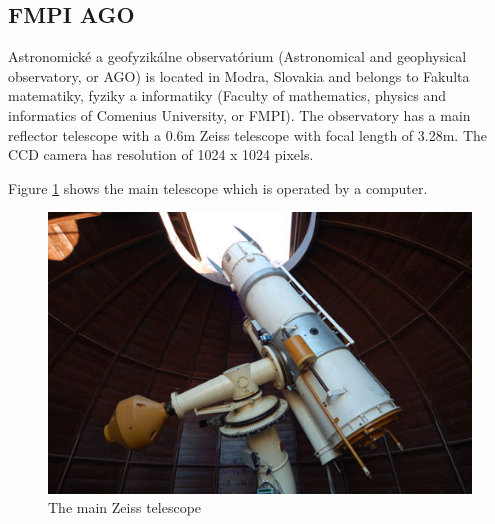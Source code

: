\subsection{FMPI AGO}\label{subsec:fmpi_ago}
Astronomické a geofyzikálne observatórium (Astronomical and geophysical observatory, or AGO) is located in Modra, Slovakia and belongs to Fakulta matematiky, fyziky a informatiky (Faculty of mathematics, physics and informatics of Comenius University, or FMPI). The observatory has a main reflector telescope with a 0.6m Zeiss telescope with focal length of 3.28m. The CCD camera has resolution of 1024 x 1024 pixels.

	Figure \ref{fig:fmpiago1} shows the main telescope which is operated by a computer.

\begin{figure}[H]
  \includegraphics[width=\linewidth]{images/FMPIAGO1}
  \caption{The main Zeiss telescope}
  \label{fig:fmpiago1}
\end{figure}
